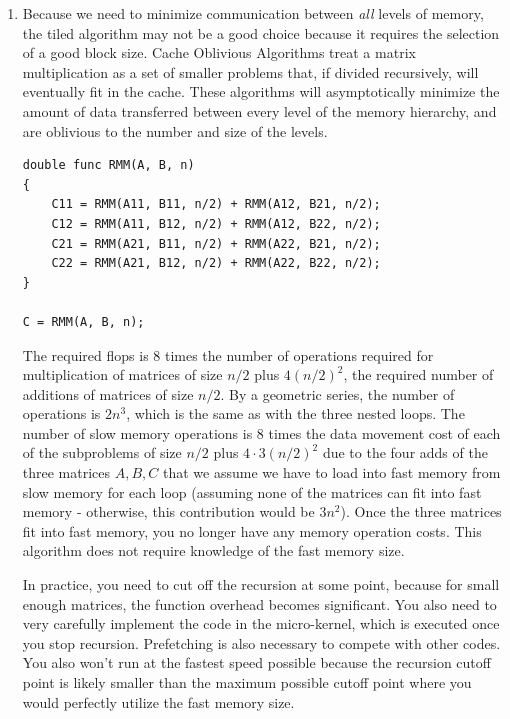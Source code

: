 \documentclass[10pt]{article}
\begin{document}
\begin{flushleft}
\begin{enumerate}
\item Because we need to minimize communication between \textit{all} levels of memory, the tiled algorithm may not be a good choice because it requires the selection of a good block size. Cache Oblivious Algorithms treat a matrix multiplication as a set of smaller problems that, if divided recursively, will eventually fit in the cache. These algorithms will asymptotically minimize the amount of data transferred between every level of the memory hierarchy, and are oblivious to the number and size of the levels.

\begin{lstlisting}[basicstyle=\ttfamily\small]
double func RMM(A, B, n)
{
	C11 = RMM(A11, B11, n/2) + RMM(A12, B21, n/2);
	C12 = RMM(A11, B12, n/2) + RMM(A12, B22, n/2);
	C21 = RMM(A21, B11, n/2) + RMM(A22, B21, n/2);
	C22 = RMM(A21, B12, n/2) + RMM(A22, B22, n/2);
}

C = RMM(A, B, n);
\end{lstlisting}

The required flops is 8 times the number of operations required for multiplication of matrices of size \(n/2\) plus \(4(n/2)^2\), the required number of additions of matrices of size \(n/2\). By a geometric series, the number of operations is \(2n^3\), which is the same as with the three nested loops. The number of slow memory operations is 8 times the data movement cost of each of the subproblems of size \(n/2\) plus \(4\cdot3(n/2)^2\) due to the four adds of the three matrices \(A, B, C\) that we assume we have to load into fast memory from slow memory for each loop (assuming none of the matrices can fit into fast memory - otherwise, this contribution would be \(3n^2\)). Once the three matrices fit into fast memory, you no longer have any memory operation costs. This algorithm does not require knowledge of the fast memory size.

In practice, you need to cut off the recursion at some point, because for small enough matrices, the function overhead becomes significant. You also need to very carefully implement the code in the micro-kernel, which is executed once you stop recursion. Prefetching is also necessary to compete with other codes. You also won't run at the fastest speed possible because the recursion cutoff point is likely smaller than the maximum possible cutoff point where you would perfectly utilize the fast memory size.


\end{enumerate}
\end{flushleft}
\end{document}
